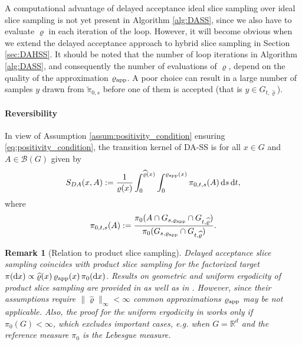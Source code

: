 \documentclass[sn-mathphys-num]{sn-jnl}%
\theoremstyle{thmstyleone}%
\theoremstyle{thmstyletwo}%
\newtheorem{remark}{Remark}%
\theoremstyle{thmstylethree}%
\newcommand{\rhoapp}{\varrho_{{\rm app}}}
\newcommand{\change}[1]{\bgroup\color{black}#1\egroup}    %
\begin{document}
A computational advantage of delayed acceptance ideal slice sampling over ideal slice sampling is not yet present in Algorithm \ref{alg:DASS}, since we also have to evaluate $\varrho$ in each iteration of the loop.
However, it will become obvious when we extend the delayed acceptance approach to hybrid slice sampling in Section \ref{sec:DAHSS}.
It should be noted that the number of loop iterations in Algorithm \ref{alg:DASS}, and consequently the number of evaluations of $\varrho$, depend on the quality of the approximation $\rhoapp$. A poor choice can result in a large number of samples $y$ drawn from $\widetilde{\pi}_{0,s}$ before one of them is accepted (that is $y\in G_{t,\widehat{\varrho}}$).

\paragraph{Reversibility}

\change{In view of Assumption \ref{assum:positivity_condition} ensuring \eqref{eq:positivity_condition},
the transition kernel of DA-SS is for all $x\in G$ and $A\in\mathcal{B}(G)$ given by
\begin{align}\label{PMLR:DASS:transitionkernel}
	S_{DA}(x,A):= \frac{1}{\varrho(x)}\int_0^{\widehat{\varrho}(x)} \int_0^{\rhoapp(x)} \pi_{0,t,s}(A)  \, \mathrm{d}s  \, \mathrm{d}t, 
\end{align}
where 
\begin{align*}
	\pi_{0,t,s}(A):=\frac{\pi_0(A \cap G_{s,\rhoapp} \cap  G_{t,\widehat{\varrho}})}{\pi_0(G_{s,\rhoapp} \cap G_{t,\widehat{\varrho}})}.
\end{align*}}


\begin{remark}[Relation to product slice sampling]
Delayed acceptance slice sampling coincides with product slice sampling for the factorized target $\pi(\text{d} x) \propto \widehat{\varrho}(x)\,\rhoapp(x) \, \pi_0(\text{d}x)$.
Results on geometric and uniform ergodicity of product slice sampling are provided in \cite{RobertsRosenthal1999} as well as in \cite{MiraTierney2002}.
However, since their assumptions require $\| \widehat{\varrho}\|_\infty < \infty$ common approximations $\rhoapp$ may be not applicable.
Also, the proof for the uniform ergodicity in \cite{MiraTierney2002} works only if $\pi_0(G)<\infty$, which excludes important cases, e.g. when $G=\mathbb R^d$ and the reference measure $\pi_0$ is the Lebesgue measure.
\end{remark}
\end{document}
